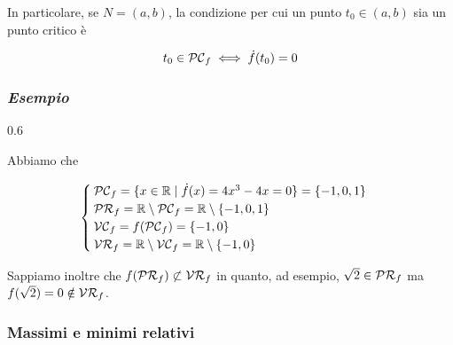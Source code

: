 In particolare, se $ N = (a,b) $, la condizione per cui un punto $ t_{0} \in (a,b) $ sia un punto critico è

\begin{equation}
	t_{0} \in \mathcal{PC}_{f} \iff \dot{f}(t_{0}) = 0
\end{equation}

\subsubsection{\textit{Esempio}}

	{0.6}{%
			}

Abbiamo che

\begin{equation}
	\begin{cases}
		\mathcal{PC}_{f} = \{ x \in \mathbb{R} \mid \dot{f}(x) = 4 x^{3} - 4 x = 0 \} = \{ -1, 0, 1 \}\\
		\mathcal{PR}_{f} = \mathbb{R} \setminus \mathcal{PC}_{f} = \mathbb{R} \setminus \{ -1, 0, 1 \}\\
		\mathcal{VC}_{f} = f(\mathcal{PC}_{f}) = \{ -1, 0 \}\\
		\mathcal{VR}_{f} = \mathbb{R} \setminus \mathcal{VC}_{f} = \mathbb{R} \setminus \{ -1, 0 \}
	\end{cases}
\end{equation}

Sappiamo inoltre che $ f(\mathcal{PR}_{f}) \not\subset \mathcal{VR}_{f} $ in quanto, ad esempio, $ \sqrt{2} \in \mathcal{PR}_{f} $ ma $ f(\sqrt{2}) = 0 \notin \mathcal{VR}_{f} $.

\subsubsection{Massimi e minimi relativi}

